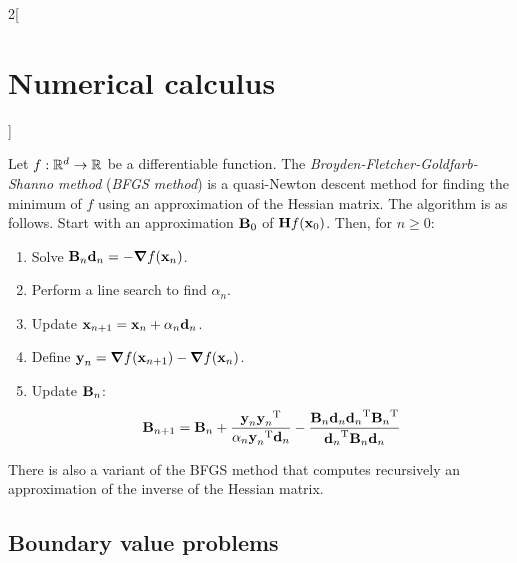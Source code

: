 \documentclass[../../../main_math.tex]{subfiles}
\begin{document}
\begin{multicols}{2}[\section{Numerical calculus}]
\begin{definition}
    Let $f:\mathbb{R}^d\rightarrow\mathbb{R}$ be a differentiable function. The \emph{Broyden-Fletcher-Goldfarb-Shanno method} (\emph{BFGS method}) is a quasi-Newton descent method for finding the minimum of $f$ using an approximation of the Hessian matrix. The algorithm is as follows. Start with an approximation $\boldsymbol{\mathrm{B}}_0$ of $\boldsymbol{\mathrm{H}}f(\boldsymbol{\mathrm{x}}_0)$. Then, for $n\geq 0$:
    \begin{enumerate}
      \item Solve $\boldsymbol{\mathrm{B}}_n\boldsymbol{\mathrm{d}}_n=-\grad f(\boldsymbol{\mathrm{x}}_n)$.
      \item Perform a line search to find $\alpha_n$.
      \item Update $\boldsymbol{\mathrm{x}}_{n+1}=\boldsymbol{\mathrm{x}}_n+\alpha_n\boldsymbol{\mathrm{d}}_n$.
      \item Define $\boldsymbol{\mathrm{y}}_n=\grad f(\boldsymbol{\mathrm{x}}_{n+1})-\grad f(\boldsymbol{\mathrm{x}}_n)$.
      \item Update $\boldsymbol{\mathrm{B}}_{n}$:
            $$
              \boldsymbol{\mathrm{B}}_{n+1}=\boldsymbol{\mathrm{B}}_n+\frac{\boldsymbol{\mathrm{y}}_n{\boldsymbol{\mathrm{y}}_n}^{\mathrm{T}}}{\alpha_n{\boldsymbol{\mathrm{y}}_n}^{\mathrm{T}}\boldsymbol{\mathrm{d}}_n}-\frac{\boldsymbol{\mathrm{B}}_n\boldsymbol{\mathrm{d}}_n{\boldsymbol{\mathrm{d}}_n}^{\mathrm{T}}{\boldsymbol{\mathrm{B}}_n}^{\mathrm{T}}}{{\boldsymbol{\mathrm{d}}_n}^{\mathrm{T}}\boldsymbol{\mathrm{B}}_n\boldsymbol{\mathrm{d}}_n}
            $$
    \end{enumerate}
  \end{definition}
  \begin{remark}
    There is also a variant of the BFGS method that computes recursively an approximation of the inverse of the Hessian matrix.
  \end{remark}
  \subsection{Boundary value problems}

\end{multicols}
\end{document}
